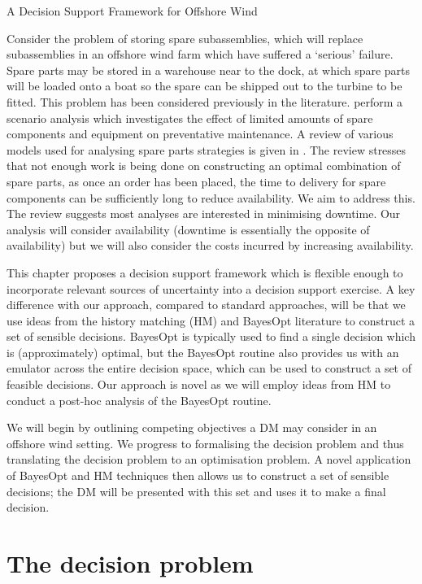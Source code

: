 \begin{chapter}{A Decision Support Framework for Offshore Wind \label{Ch:ds-for-ow}}

Consider the problem of storing spare subassemblies, which will replace subassemblies in an offshore wind farm which have suffered a `serious' failure. Spare parts may be stored in a warehouse near to the dock, at which spare parts will be loaded onto a boat so the spare can be shipped out to the turbine to be fitted. This problem has been considered previously in the literature. \citet{Tracht2013} perform a scenario analysis which investigates the effect of limited amounts of spare components and equipment on preventative maintenance. A review of various models used for analysing spare parts strategies is given in \citet{Tusar2022}. The review stresses that not enough work is being done on constructing an optimal combination of spare parts, as once an order has been placed, the time to delivery for spare components can be sufficiently long to reduce availability. We aim to address this. The review suggests most analyses are interested in minimising downtime. Our analysis will consider availability (downtime is essentially the opposite of availability) but we will also consider the costs incurred by increasing availability.

This chapter proposes a decision support framework which is flexible enough to incorporate relevant sources of uncertainty into a decision support exercise. A key difference with our approach, compared to standard approaches, will be that we use ideas from the history matching (HM) and BayesOpt literature to construct a set of sensible decisions. BayesOpt is typically used to find a single decision which is (approximately) optimal, but the BayesOpt routine also provides us with an emulator across the entire decision space, which can be used to construct a set of feasible decisions. Our approach is novel as we will employ ideas from HM to conduct a post-hoc analysis of the BayesOpt routine.

We will begin by outlining competing objectives a DM may consider in an offshore wind setting. We progress to formalising the decision problem and thus translating the decision problem to an optimisation problem. A novel application of BayesOpt and HM techniques then allows us to construct a set of sensible decisions; the DM will be presented with this set and uses it to make a final decision.
\section{The decision problem}


\end{chapter}
